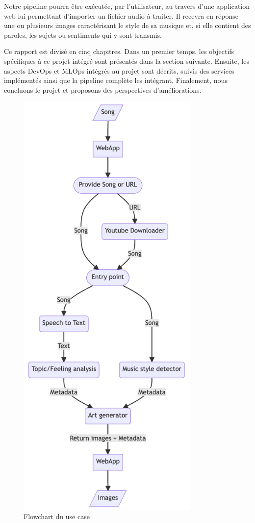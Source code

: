Notre pipeline pourra être exécutée, par l'utilisateur, au travers d'une application web lui permettant d'importer un fichier audio à traiter. Il recevra en réponse une ou plusieurs images caractérisant le style de sa musique et, si elle contient des paroles, les sujets ou sentiments qui y sont transmis.

Ce rapport est divisé en cinq chapitres. Dans un premier temps, les objectifs spécifiques à ce projet intégré sont présentés dans la section suivante. Ensuite, les aspects DevOps et MLOps intégrés au projet sont décrits, suivis des services implémentés ainsi que la pipeline complète les intégrant. Finalement, nous concluons le projet et proposons des perspectives d'améliorations.


\begin{figure}[H]
    \begin{center}
        \includegraphics[height=22cm,]{rsc/flowchart.png}
        \caption{Flowchart du use case}
        \label{fig:flowchart}
    \end{center}
\end{figure}


